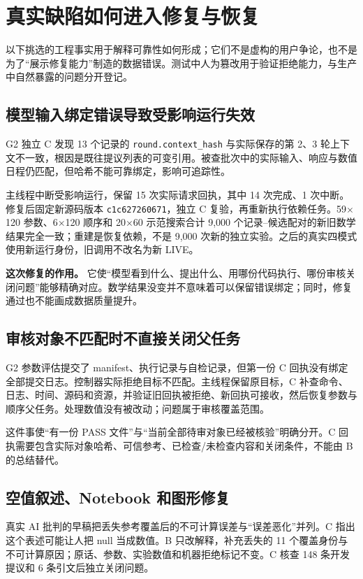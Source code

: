 \documentclass[11pt,a4paper]{article}
\begin{document}
\section{真实缺陷如何进入修复与恢复}
以下挑选的工程事实用于解释可靠性如何形成；它们不是虚构的用户争论，也不是为了“展示修复能力”制造的数据错误。测试中人为篡改用于验证拒绝能力，与生产中自然暴露的问题分开登记。

\subsection{模型输入绑定错误导致受影响运行失效}
G2 独立 C 发现 13 个记录的 \texttt{round.context\_hash} 与实际保存的第 2、3 轮上下文不一致，根因是既往提议列表的可变引用。被查批次中的实际输入、响应与数值日程仍匹配，但哈希不能可靠绑定，影响可追踪性。

主线程中断受影响运行，保留 15 次实际请求回执，其中 14 次完成、1 次中断。修复后固定新源码版本 \texttt{c1c627260671}，独立 C 复验，再重新执行依赖任务。59$\times$120 参数、6$\times$120 顺序和 20$\times$60 示范搜索合计 9,000 个记录--候选配对的新旧数学结果完全一致；重建是恢复依赖，不是 9,000 次新的独立实验。之后的真实四模式使用新运行身份，旧调用不改名为新 LIVE。

\begin{decisionbox}
\textbf{这次修复的作用。} 它使“模型看到什么、提出什么、用哪份代码执行、哪份审核关闭问题”能够精确对应。数学结果没变并不意味着可以保留错误绑定；同时，修复通过也不能画成数据质量提升。
\end{decisionbox}

\subsection{审核对象不匹配时不直接关闭父任务}
G2 参数评估提交了 manifest、执行记录与自检记录，但第一份 C 回执没有绑定全部提交日志。控制器实际拒绝目标不匹配。主线程保留原目标，C 补查命令、日志、时间、源码和资源，并验证旧回执被拒绝、新回执可接收，然后恢复参数与顺序父任务。处理数值没有被改动；问题属于审核覆盖范围。

这件事使“有一份 PASS 文件”与“当前全部待审对象已经被核验”明确分开。C 回执需要包含实际对象哈希、可信参考、已检查/未检查内容和关闭条件，不能由 B 的总结替代。

\subsection{空值叙述、Notebook 和图形修复}
真实 AI 批判的早稿把丢失参考覆盖后的不可计算误差与“误差恶化”并列。C 指出这个表述可能让人把 null 当成数值。B 只改解释，补充丢失的 11 个覆盖身份与不可计算原因；原话、参数、实验数值和机器拒绝标记不变。C 核查 148 条开发提议和 6 条引文后独立关闭问题。
\end{document}
